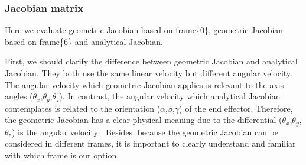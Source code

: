 \subsubsection{Jacobian matrix} 
\label{sec:jacobian}
\hspace*{6mm}Here we evaluate geometric Jacobian based on frame\{0\}, geometric Jacobian based on frame\{6\} and analytical Jacobian.
\par
First, we should clarify the difference between geometric Jacobian and analytical Jacobian. They both use the same linear velocity but different angular velocity. The angular velocity which geometric Jacobian applies is relevant to the axis angles ($\theta _x$,$\theta _y$,$\theta _z$). In contrast, the angular velocity which analytical Jacobian contemplates is related to the orientation ($\alpha$,$\beta$,$\gamma$) of the end effector. Therefore, the geometric Jacobian has a clear physical meaning due to the differential ($\theta _x$,$\theta _y$,$\theta _z$) is the angular velocity . Besides, because the geometric Jacobian can be considered in different frames, it is important to clearly understand and familiar with which frame is our option.
